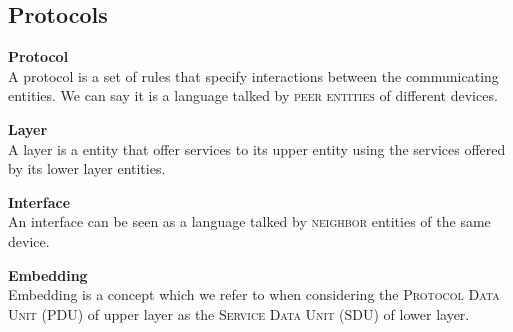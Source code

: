 \subsection{Protocols}
\begin{definition}{\textbf{Protocol}\\}
A protocol is a set of rules that specify interactions between the communicating entities. We can say it is a language talked by \textsc{peer entities} of different devices.
\end{definition}
\begin{definition}{\textbf{Layer}\\}
A layer is a entity that offer services to its upper entity using the services offered by its lower layer entities.
\end{definition}
\begin{definition}{\textbf{Interface}\\}
An interface can be seen as a language talked by \textsc{neighbor} entities of the same device.
\end{definition}
\begin{definition}{\textbf{Embedding}\\}
Embedding is a concept which we refer to when considering the \textsc{Protocol Data Unit (PDU)} of upper layer as the \textsc{Service Data Unit (SDU)} of lower layer.
\end{definition}

